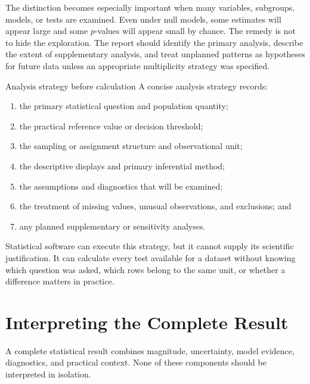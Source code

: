 The distinction becomes especially important when many variables, subgroups, models, or tests are examined. Even under null models, some estimates will appear large and some $p$-values will appear small by chance. The remedy is not to hide the exploration. The report should identify the primary analysis, describe the extent of supplementary analysis, and treat unplanned patterns as hypotheses for future data unless an appropriate multiplicity strategy was specified.

\begin{custombox}{Analysis strategy before calculation}
A concise analysis strategy records:
\begin{enumerate}
  \item the primary statistical question and population quantity;
  \item the practical reference value or decision threshold;
  \item the sampling or assignment structure and observational unit;
  \item the descriptive displays and primary inferential method;
  \item the assumptions and diagnostics that will be examined;
  \item the treatment of missing values, unusual observations, and exclusions; and
  \item any planned supplementary or sensitivity analyses.
\end{enumerate}
\end{custombox}

Statistical software can execute this strategy, but it cannot supply its scientific justification. It can calculate every test available for a dataset without knowing which question was asked, which rows belong to the same unit, or whether a difference matters in practice.

\section{Interpreting the Complete Result}
\label{sec:integrated-result-interpretation}

A complete statistical result combines magnitude, uncertainty, model evidence, diagnostics, and practical context. None of these components should be interpreted in isolation.

